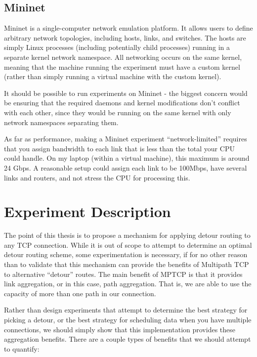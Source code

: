 \documentclass{article}
\begin{document}
\subsection{Mininet}

Mininet is a single-computer network emulation platform. It allows users to
define arbitrary network topologies, including hosts, links, and switches. The
hosts are simply Linux processes (including potentially child processes) running
in a separate kernel network namespace. All networking occurs on the same
kernel, meaning that the machine running the experiment must have a custom
kernel (rather than simply running a virtual machine with the custom kernel).

It should be possible to run experiments on Mininet - the biggest concern would
be ensuring that the required daemons and kernel modifications don't conflict
with each other, since they would be running on the same kernel with only
network namespaces separating them.

As far as performance, making a Mininet experiment ``network-limited'' requires
that you assign bandwidth to each link that is less than the total your CPU
could handle. On my laptop (within a virtual machine), this maximum is around 24
Gbps. A reasonable setup could assign each link to be 100Mbps, have several
links and routers, and not stress the CPU for processing this.

\section{Experiment Description}

The point of this thesis is to propose a mechanism for applying detour routing
to any TCP connection. While it is out of scope to attempt to determine an
optimal detour routing scheme, some experimentation is necessary, if for no
other reason than to validate that this mechanism can provide the benefits of
Multipath TCP to alternative ``detour'' routes. The main benefit of MPTCP is
that it provides link aggregation, or in this case, path aggregation. That is,
we are able to use the capacity of more than one path in our connection.

Rather than design experiments that attempt to determine the best strategy for
picking a detour, or the best strategy for scheduling data when you have
multiple connections, we should simply show that this implementation provides
these aggregation benefits. There are a couple types of benefits that we should
attempt to quantify:
\end{document}
